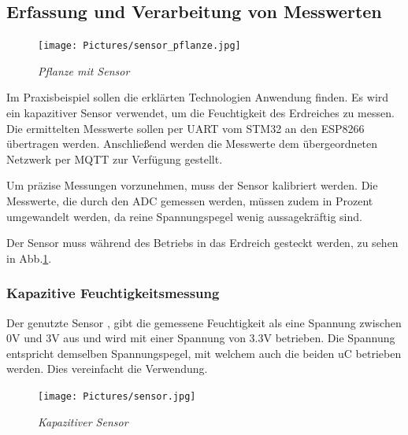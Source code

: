 \subsection{Erfassung und Verarbeitung von Messwerten}

\begin{figure}
   \vspace{-\baselineskip}
       \centering
       \texttt{[image: Pictures/sensor\_pflanze.jpg]}
       \caption{\textit{Pflanze mit Sensor}}
       \label{img:PflanzeSensor}
\end{figure} 

Im Praxisbeispiel sollen die erklärten Technologien Anwendung finden. Es wird ein kapazitiver Sensor verwendet,
um die Feuchtigkeit des Erdreiches zu messen. Die ermittelten Messwerte sollen per \acs{UART} vom STM32
an den ESP8266 übertragen werden.
Anschließend werden die Messwerte dem übergeordneten Netzwerk per \acs{MQTT} zur Verfügung gestellt.

\smallskip

Um präzise Messungen vorzunehmen, muss der Sensor kalibriert werden. Die Messwerte, die durch den \acs{ADC}
gemessen werden, müssen zudem in Prozent umgewandelt werden, da reine Spannungspegel wenig aussagekräftig sind.

\smallskip

Der Sensor muss während des Betriebs in das Erdreich gesteckt werden, zu sehen in Abb.\ref{img:PflanzeSensor}.




\subsubsection{Kapazitive Feuchtigkeitsmessung}

Der genutzte Sensor \citep{Sensor}, gibt die gemessene Feuchtigkeit als eine Spannung zwischen 0V und 3V aus und wird mit einer Spannung von 3.3V betrieben. Die Spannung 
entspricht demselben Spannungspegel, mit welchem auch die beiden \acs{uC} betrieben werden. Dies vereinfacht die Verwendung.

\smallskip

\begin{figure}
   \vspace{-\baselineskip}
       \centering
       \texttt{[image: Pictures/sensor.jpg]}
       \caption{\textit{Kapazitiver Sensor}}
       \label{img:Sensor}
\end{figure}

